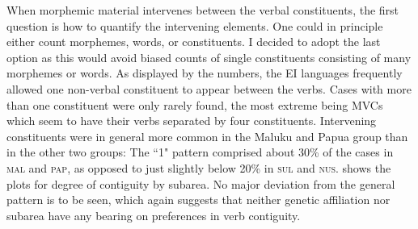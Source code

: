 \largerpage[1]
When morphemic material intervenes between the verbal constituents, the first question is how to quantify the intervening elements. One could in principle either count morphemes, words, or constituents. I decided to adopt the last option as this would avoid biased counts of single constituents consisting of many morphemes or words. As displayed by the numbers, the EI languages frequently allowed one non-verbal constituent to appear between the verbs. Cases with more than one constituent were only rarely found, the most extreme being MVCs which seem to have their verbs separated by four constituents. Intervening constituents were in general more common in the Maluku and Papua group than in the other two groups: The ``1" pattern comprised about 30\% of the cases in  \textsc{mal} and \textsc{pap}, as opposed to just slightly below 20\% in \textsc{sul} and \textsc{nus}.  shows the plots for degree of contiguity by subarea. No major deviation from the general pattern is to be seen, which again suggests that neither genetic affiliation nor subarea have any bearing on preferences in verb contiguity.

